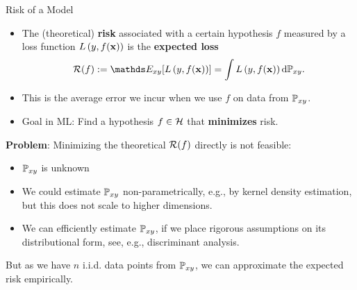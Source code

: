 \documentclass[11pt,compress,t,notes=noshow, xcolor=table]{beamer}
\begin{document}
\begin{vbframe}{Risk of a Model}

\begin{itemize}
  \item The (theoretical) \textbf{risk} associated with a certain hypothesis $f$ measured by a loss function $L\left(y, f(\mathbf{x})\right)$ is the \textbf{expected loss}
  $$ \riskf := \E_{xy} [\Lxy] = \int \Lxy \text{d}\Pxy. $$
  \item This is the average error we incur when we use $f$ on data from $\mathbb{P}_{xy}$.
  \item Goal in ML: Find a hypothesis $f \in \mathcal{H}$ that \textbf{minimizes} risk.
\end{itemize}

\framebreak


\textbf{Problem}: Minimizing the theoretical $\mathcal{R}(f)$ directly is not feasible:

\begin{itemize}
\item $\mathbb{P}_{xy}$ is unknown 
\item We could estimate $\mathbb{P}_{xy}$ non-parametrically, e.g., by kernel density estimation, but this does not scale to higher dimensions. 
\item We can efficiently estimate $\mathbb{P}_{xy}$, if we place rigorous assumptions on its distributional form, see, e.g., discriminant analysis. 
\end{itemize}

\lz

But as we have $n$ i.i.d. data points from $\mathbb{P}_{xy}$, we can
approximate the expected risk empirically. %

\end{vbframe}
\end{document}
